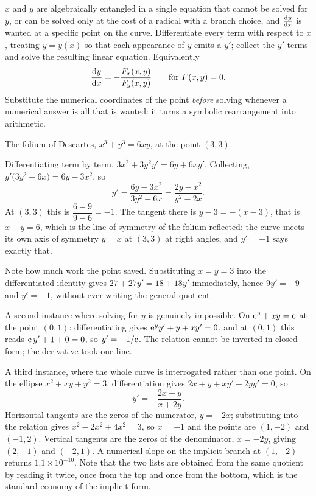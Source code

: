 \cue $x$ and $y$ are algebraically entangled in a single equation that cannot be solved for $y$, or can be solved only at the cost of a radical with a branch choice, and $\frac{\mathrm{d}y}{\mathrm{d}x}$ is wanted at a specific point on the curve.
\method Differentiate every term with respect to $x$, treating $y=y(x)$ so that each appearance of $y$ emits a $y'$; collect the $y'$ terms and solve the resulting linear equation. Equivalently
\[
\frac{\mathrm{d}y}{\mathrm{d}x}=-\frac{F_{x}(x,y)}{F_{y}(x,y)}\qquad\text{for }F(x,y)=0 .
\]
Substitute the numerical coordinates of the point \emph{before} solving whenever a numerical answer is all that is wanted: it turns a symbolic rearrangement into arithmetic.

\begin{worked}
The folium of Descartes, $x^{3}+y^{3}=6xy$, at the point $(3,3)$.

Differentiating term by term, $3x^{2}+3y^{2}y'=6y+6xy'$. Collecting, $y'\bigl(3y^{2}-6x\bigr)=6y-3x^{2}$, so
\[
y'=\frac{6y-3x^{2}}{3y^{2}-6x}=\frac{2y-x^{2}}{y^{2}-2x}.
\]
At $(3,3)$ this is $\dfrac{6-9}{9-6}=-1$. The tangent there is $y-3=-(x-3)$, that is $x+y=6$, which is the line of symmetry of the folium reflected: the curve meets its own axis of symmetry $y=x$ at $(3,3)$ at right angles, and $y'=-1$ says exactly that.

Note how much work the point saved. Substituting $x=y=3$ into the differentiated identity gives $27+27y'=18+18y'$ immediately, hence $9y'=-9$ and $y'=-1$, without ever writing the general quotient.

A second instance where solving for $y$ is genuinely impossible. On $\mathrm{e}^{y}+xy=\mathrm{e}$ at the point $(0,1)$: differentiating gives $\mathrm{e}^{y}y'+y+xy'=0$, and at $(0,1)$ this reads $\mathrm{e}\,y'+1+0=0$, so $y'=-1/\mathrm{e}$. The relation cannot be inverted in closed form; the derivative took one line.

A third instance, where the whole curve is interrogated rather than one point. On the ellipse $x^{2}+xy+y^{2}=3$, differentiation gives $2x+y+xy'+2yy'=0$, so
\[
y'=-\frac{2x+y}{x+2y}.
\]
Horizontal tangents are the zeros of the numerator, $y=-2x$; substituting into the relation gives $x^{2}-2x^{2}+4x^{2}=3$, so $x=\pm1$ and the points are $(1,-2)$ and $(-1,2)$. Vertical tangents are the zeros of the denominator, $x=-2y$, giving $(2,-1)$ and $(-2,1)$. A numerical slope on the implicit branch at $(1,-2)$ returns $1.1\times10^{-10}$. Note that the two lists are obtained from the same quotient by reading it twice, once from the top and once from the bottom, which is the standard economy of the implicit form.
\end{worked}


